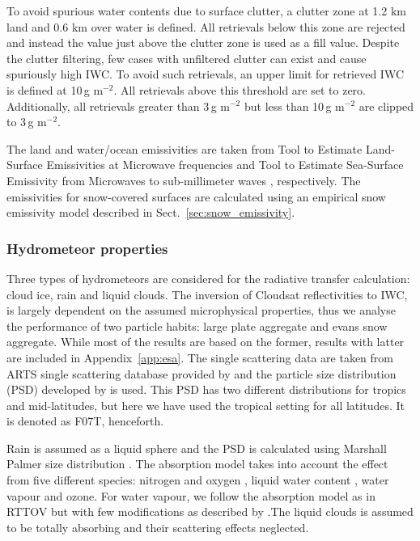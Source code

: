 \documentclass[amt, manuscript]{copernicus}
\begin{document}
To avoid spurious water contents due to surface clutter, a clutter zone at 1.2\,\,km land and 0.6\,\,km over water is defined. All retrievals below this zone are rejected and instead the value just above the clutter zone is used as a fill value. Despite the clutter filtering, few cases with unfiltered clutter can exist and cause spuriously high IWC. To avoid such retrievals, an upper limit for retrieved IWC is defined at 10\,g m$^{-2}$. All retrievals above this threshold are set to zero. Additionally, all retrievals greater than 3\,g m$^{-2}$ but less than 10\,g m$^{-2}$ are clipped to 3\,g m$^{-2}$.



The land and water/ocean emissivities are taken from Tool to Estimate Land-Surface Emissivities at Microwave frequencies  \citep[TELSEM,][]{aires2011tool} and  Tool to Estimate Sea-Surface Emissivity from Microwaves to sub-millimeter waves 
\citep[TESSEM,][]{prigent2017sea}, respectively. The emissivities for snow-covered surfaces are calculated using an empirical snow emissivity model described in Sect.~\ref{sec:snow_emissivity}.


\subsubsection{Hydrometeor properties}
\label{sec:hydrometeor_prop}

Three types of hydrometeors are considered for the radiative transfer calculation: cloud ice, rain and liquid clouds. The inversion of Cloudsat reflectivities to IWC, is largely dependent on the assumed microphysical properties, thus we analyse the performance of two particle habits: large plate aggregate and evans snow aggregate. While most of the results are based on the former, results with latter are included in Appendix~\ref{app:esa}. The single scattering data are taken from ARTS single scattering database provided by \citet{eriksson:agene:18} and the particle size distribution (PSD) developed by \citet{field:snows:07} is used. This PSD has two different distributions for tropics and mid-latitudes, but here we have used the tropical setting for all latitudes. It is denoted as F07T, henceforth.

Rain is assumed as a liquid sphere and the PSD is calculated using Marshall Palmer size distribution \citep{marshall:thedi:48}. The absorption model takes into account the effect from five different species: nitrogen and oxygen \citep{pwr:93}, liquid water content \citep{ellison2007permittivity}, water vapour and ozone. For water
vapour, we follow the absorption model as in RTTOV \citep{saunders:rttov:18} but with few modifications as described by \citet{turner2019amsutran}.The liquid clouds is assumed to be totally absorbing and their scattering effects neglected. 
\end{document}
